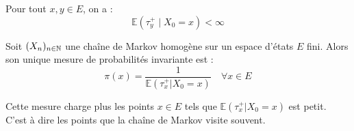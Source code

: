 \begin{lemma}
    Pour tout $x,y \in E$, on a :   
        $$ \mathbb{E}( \tau_y^+ \; | \; X_0 = x) < \infty $$ 
\end{lemma}

\begin{theorem}
    Soit $(X_n)_{n \in \mathbb{N}}$ une chaîne de Markov homogène sur un espace d'états $E$ fini. 
    Alors son unique mesure de probabilités invariante est : 
        \[ \boxed{\pi(x) = \frac{1}{ \mathbb{E}( \tau_x^+ | X_0 = x) } \quad \forall x \in E} \]  
\end{theorem}

\begin{remark}
    Cette mesure charge plus les points $x \in E$ tels que $ \mathbb{E}( \tau_x^+ | X_0 = x)$ est petit. 
    C'est à dire les points que la chaîne de Markov visite souvent.  
\end{remark}

